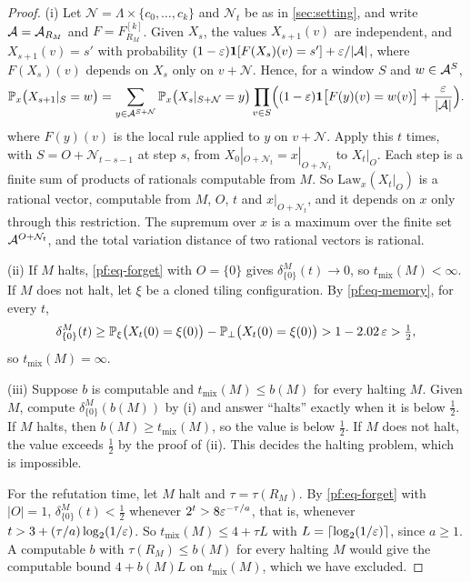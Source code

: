 \begin{proof}
(i) Let $\mathcal N=\Lambda\times\{c_0,\dots,c_k\}$ and $\mathcal N_t$ be as in \cref{sec:setting}, and write $\mathcal{A}=\mathcal{A}_{R_M}$ and $F=F^{[k]}_{R_M}$. Given $X_s$, the values $X_{s+1}(v)$ are independent, and $X_{s+1}(v)=s'$ with probability $(1-\varepsilon)\mathbf 1[F(X_s)(v)=s']+\varepsilon/|\mathcal{A}|$, where $F(X_s)(v)$ depends on $X_s$ only on $v+\mathcal N$. Hence, for a window $S$ and $w\in\mathcal{A}^S$,
\[
\mathbb{P}_x\bigl(X_{s+1}|_S=w\bigr)=\sum_{y\in\mathcal{A}^{S+\mathcal N}}\mathbb{P}_x\bigl(X_s|_{S+\mathcal N}=y\bigr)\prod_{v\in S}\Bigl((1-\varepsilon)\mathbf 1\bigl[F(y)(v)=w(v)\bigr]+\frac{\varepsilon}{|\mathcal{A}|}\Bigr).
\]
where $F(y)(v)$ is the local rule applied to $y$ on $v+\mathcal N$. Apply this $t$ times, with $S=O+\mathcal N_{t-s-1}$ at step $s$, from $X_0|_{O+\mathcal N_t}=x|_{O+\mathcal N_t}$ to $X_t|_O$. Each step is a finite sum of products of rationals computable from $M$. So $\mathrm{Law}_x(X_t|_O)$ is a rational vector, computable from $M$, $O$, $t$ and $x|_{O+\mathcal N_t}$, and it depends on $x$ only through this restriction. The supremum over $x$ is a maximum over the finite set $\mathcal{A}^{O+\mathcal N_t}$, and the total variation distance of two rational vectors is rational.

(ii) If $M$ halts, \eqref{pf:eq-forget} with $O=\{0\}$ gives $\delta^M_{\{0\}}(t)\to0$, so $t_{\mathrm{mix}}(M)<\infty$. If $M$ does not halt, let $\xi$ be a cloned tiling configuration. By \eqref{pf:eq-memory}, for every $t$,
\[
\delta^M_{\{0\}}(t)\ge\mathbb{P}_\xi\bigl(X_t(0)=\xi(0)\bigr)-\mathbb{P}_\bot\bigl(X_t(0)=\xi(0)\bigr)>1-2.02\,\varepsilon>\tfrac12,
\]
so $t_{\mathrm{mix}}(M)=\infty$.

(iii) Suppose $b$ is computable and $t_{\mathrm{mix}}(M)\le b(M)$ for every halting $M$. Given $M$, compute $\delta^M_{\{0\}}(b(M))$ by (i) and answer ``halts'' exactly when it is below $\frac12$. If $M$ halts, then $b(M)\ge t_{\mathrm{mix}}(M)$, so the value is below $\frac12$. If $M$ does not halt, the value exceeds $\frac12$ by the proof of (ii). This decides the halting problem, which is impossible.

For the refutation time, let $M$ halt and $\tau=\tau(R_M)$. By \eqref{pf:eq-forget} with $|O|=1$, $\delta^M_{\{0\}}(t)<\frac12$ whenever $2^t>8\varepsilon^{-\tau/a}$, that is, whenever $t>3+(\tau/a)\log_2(1/\varepsilon)$. So $t_{\mathrm{mix}}(M)\le4+\tau L$ with $L=\lceil\log_2(1/\varepsilon)\rceil$, since $a\ge1$. A computable $b$ with $\tau(R_M)\le b(M)$ for every halting $M$ would give the computable bound $4+b(M)L$ on $t_{\mathrm{mix}}(M)$, which we have excluded.
\end{proof}

